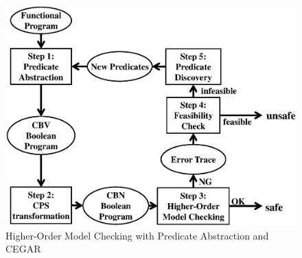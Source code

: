 \begin{figure}[tp]
 \begin{center}
  \includegraphics[scale=0.34]{overall.eps}
 \end{center}
\caption{Higher-Order Model Checking with Predicate Abstraction and CEGAR}
\label{fig:cegar}
\end{figure}


%

